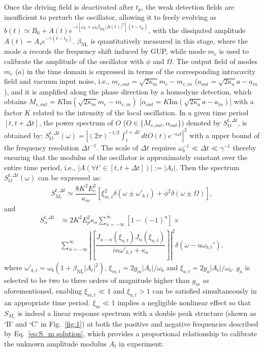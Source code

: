 \documentclass[aps,prl,twocolumn,superscriptaddress]{revtex4-2}
\begin{document}
Once the driving field is deactivated after $t_p$, the weak detection fields are insufficient to perturb the oscillator, allowing it to freely evolving as $b(t)\simeq B_0+A(t)e^{-i[\omega_b+\omega_b\beta_{\text{NL}}\vert A(t)\vert^2](t-t_p)}$, with the dissipated amplitude $A(t)=A_se^{-\gamma(t-t_p)}$. $\beta_{\text{NL}}$ is quantitatively measured in this stage, where the mode $a$ records the frequency shift induced by GUP, while mode $m_c$ is used to calibrate the amplitude of the oscillator with $\phi$ and $\Omega$. The output field of modes $m_c$ ($a$) in the time domain is expressed in terms of the corresponding intracavity field and vacuum input noise, i.e., $m_{c,out}=\sqrt{2\kappa_m}m_c-m_{c,in}$ ($a_{out}=\sqrt{2\kappa_a}a-a_{in}$), and it is amplified along the phase direction by a homodyne detection, which obtains $M_{c,out}=K\text{Im}(\sqrt{2\kappa_m}m_c-m_{c,in})$ [$\alpha_{out}=K\text{Im}(\sqrt{2\kappa_a}a-a_{in})$] with a factor $K$ related to the intensity of the local oscillation. In a given time period $[t,t+\Delta t]$, the power spectrum of $O$ ($O\in\{M_{c,out},\alpha_{out}\}$) denoted by $S_O^{t,\Delta t}$, is obtained by: $S_O^{t,\Delta t}(\omega)=\left\vert {(2\pi)}^{-1/2}\int_{t}^{t+\Delta t}dt O(t)e^{-i\omega t}\right\vert^2$ with a upper bound of the frequency resolution $\Delta t^{-1}$. The scale of $\Delta t$ requires $\omega_b^{-1}\ll \Delta t \ll\gamma^{-1}$ thereby ensuring that the modulus of the oscillator is approximately constant over the entire time period, i.e., $\vert A(\forall t'\in[t,t+\Delta t])\vert :=\vert A_t\vert$. Then the spectrum $S^{t,\Delta t}_{O}(\omega)$ can be expressed as:
\begin{equation}
\begin{split}
S_{M_c}^{t,\Delta t}\simeq \dfrac{8K^2E^2_c}{\kappa_m}\left[\xi_{m,t}^2\delta(\omega\pm\omega'_{b,t})+\phi^2\delta(\omega\pm\Omega)\right],
\end{split}
\label{eq:S_m solution}
\end{equation}
and 
\begin{equation}
\begin{split}
S_{\alpha}^{t,\Delta t}&\simeq 2K^2E^2_p\kappa_a\sum_{u=-\infty}^{\infty}[1-(-1)^{u}]\times\\
&\sum_{n=-\infty}^{\infty}\left\vert\left[\dfrac{J_{u-n}\left(\xi_{a,t}\right)J_n\left(\xi_{a,t}\right)}{in\omega'_{b,t}+\kappa_a}\right]\right\vert^2\delta(\omega-u\omega_{b,t}'),
\end{split}
\label{eq:A solution}
\end{equation}
where $\omega'_{b,t}=\omega_b(1+\beta_{\text{NL}}\vert A_t\vert^2)$, $\xi_{m,t}=2g_m\vert A_t\vert/\omega_b$ and $\xi_{a,t}=2g_a\vert A_t\vert/\omega_b$. $g_a$ is selected to be two to three orders of magnitude higher than $g_m$ as aforementioned, enabling $\xi_{m,t}\ll 1$ and $\xi_{a,t}>1$ can be satisfied simultaneously in an appropriate time period.  $\xi_m\ll 1$ implies a negligible nonlinear effect so that $S_{M_c}$ is indeed a linear response spectrum with a double peak structure (shown as `B' and `C' in Fig.~\ref{fig:1}) at both the positive and negative frequencies described by Eq.~\eqref{eq:S_m solution}, which provides a proportional relationship to calibrate the unknown amplitude modulus $A_t$ in experiment:
\end{document}
